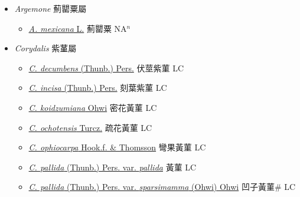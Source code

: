 
  \begin{itemize}
 \item[] \textit{Argemone} 薊罌粟屬
                    
  \begin{itemize}
        \item[] \href{http://www.theplantlist.org/tpl1.1/search?q=Argemone+mexicana}{\textit{A. mexicana} L.}   薊罌粟 NA$^n$
  \end{itemize}
 \item[] \textit{Corydalis} 紫蓳屬
                    
  \begin{itemize}
        \item[] \href{http://www.theplantlist.org/tpl1.1/search?q=Corydalis+decumbens}{\textit{C. decumbens} (Thunb.) Pers.}   伏莖紫菫 LC
        \item[] \href{http://www.theplantlist.org/tpl1.1/search?q=Corydalis+incisa}{\textit{C. incisa} (Thunb.) Pers.}   刻葉紫菫 LC
        \item[] \href{http://www.theplantlist.org/tpl1.1/search?q=Corydalis+koidzumiana}{\textit{C. koidzumiana} Ohwi}   密花黃菫 LC
        \item[] \href{http://www.theplantlist.org/tpl1.1/search?q=Corydalis+ochotensis}{\textit{C. ochotensis} Turcz.}   疏花黃菫 LC
        \item[] \href{http://www.theplantlist.org/tpl1.1/search?q=Corydalis+ophiocarpa}{\textit{C. ophiocarpa} Hook.f. \& Thomsson}   彎果黃菫 LC
        \item[] \href{http://www.theplantlist.org/tpl1.1/search?q=Corydalis+pallida+var.+pallida}{\textit{C. pallida} (Thunb.) Pers. var. \textit{pallida}}   黃菫 LC
        \item[] \href{http://www.theplantlist.org/tpl1.1/search?q=Corydalis+pallida+var.+sparsimamma}{\textit{C. pallida} (Thunb.) Pers. var. \textit{sparsimamma} (Ohwi) Ohwi}   凹子黃菫\# LC

\end{itemize}
\end{itemize}
